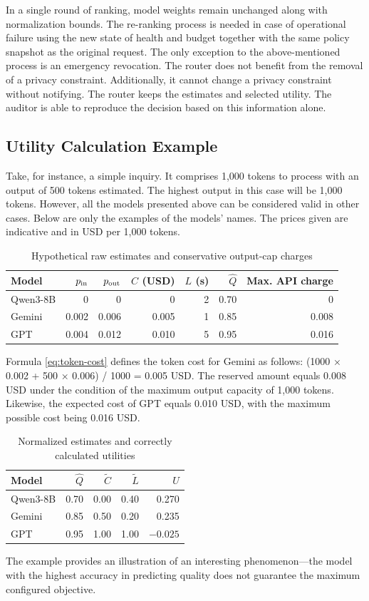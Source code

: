 \documentclass{FastFyp}
\begin{document}
In a single round of ranking, model weights remain unchanged along with normalization bounds. The re-ranking process is needed in case of operational failure using the new state of health and budget together with the same policy snapshot as the original request. The only exception to the above-mentioned process is an emergency revocation.
The router does not benefit from the removal of a privacy constraint. Additionally, it cannot change a privacy constraint without notifying. The router keeps the estimates and selected utility. The auditor is able to reproduce the decision based on this information alone.

\subsection{Utility Calculation Example}
Take, for instance, a simple inquiry. It comprises 1,000 tokens to process with an output of 500 tokens estimated. The highest output in this case will be 1,000 tokens. However, all the models presented above can be considered valid in other cases. Below are only the examples of the models’ names. The prices given are indicative and in USD per 1,000 tokens.
\begin{table}[!htbp]\centering\small
\caption{Hypothetical raw estimates and conservative output-cap charges}\label{tab:routing-raw}
\begin{tabular}{lrrrrrr}\toprule
Model & $p_{\rm in}$ & $p_{\rm out}$ & $C$ (USD) & $L$ (s) & $\hat Q$ & Max. API charge\\\midrule
Qwen3-8B & 0 & 0 & 0 & 2 & 0.70 & 0\\
Gemini & 0.002 & 0.006 & 0.005 & 1 & 0.85 & 0.008\\
GPT & 0.004 & 0.012 & 0.010 & 5 & 0.95 & 0.016\\\bottomrule
\end{tabular}

\end{table}
Formula \ref{eq:token-cost} defines the token cost for Gemini as follows: (1000 × 0.002 + 500 × 0.006) / 1000 = 0.005 USD. The reserved amount equals 0.008 USD under the condition of the maximum output capacity of 1,000 tokens. Likewise, the expected cost of GPT equals 0.010 USD, with the maximum possible cost being 0.016 USD.
\begin{table}[!htbp]\centering\small
\caption{Normalized estimates and correctly calculated utilities}\label{tab:routing-utility}
\begin{tabular}{lrrrr}\toprule
Model & $\hat Q$ & $\widetilde C$ & $\widetilde L$ & $U$\\\midrule
Qwen3-8B & 0.70 & 0.00 & 0.40 & 0.270\\
Gemini & 0.85 & 0.50 & 0.20 & 0.235\\
GPT & 0.95 & 1.00 & 1.00 & $-0.025$\\\bottomrule
\end{tabular}

\end{table}
The example provides an illustration of an interesting phenomenon---the model with the highest accuracy in predicting quality does not guarantee the maximum configured objective.
\end{document}
